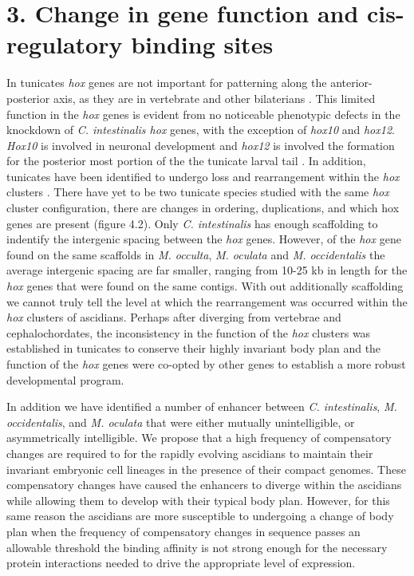 \section{3.	Change in gene function and cis-regulatory binding sites}
In tunicates \textit{hox} genes are not important for patterning along the anterior-posterior axis, as they are in vertebrate and other bilaterians \cite{finnerty_origins_2003,mallo_regulation_2013,ikuta_limited_2010}. This limited function in the \textit{hox} genes is evident from no noticeable phenotypic defects in the knockdown of \textit{C. intestinalis hox} genes, with the exception of \textit{hox10} and \textit{hox12}. \textit{Hox10} is involved in neuronal development and \textit{hox12} is involved the formation for the posterior most portion of the the tunicate larval tail \cite{ikuta_limited_2010}. In addition, tunicates have been identified to undergo loss and rearrangement within the \textit{hox} clusters \cite{ikuta_organization_2005}. There have yet to be two tunicate species studied with the same \textit{hox} cluster configuration, there are changes in ordering, duplications, and which hox genes are present (figure 4.2). Only \textit{C. intestinalis} has enough scaffolding to indentify the intergenic spacing between the \textit{hox} genes. However, of the \textit{hox} gene found on the same scaffolds in \textit{M. occulta}, \textit{M. oculata} and \textit{M. occidentalis} the average intergenic spacing are far smaller, ranging from 10-25 kb in length for the \textit{hox} genes that were found on the same contigs. With out additionally scaffolding we cannot truly tell the level at which the rearrangement was occurred within the \textit{hox} clusters of ascidians. Perhaps after diverging from vertebrae and cephalochordates, the inconsistency in the function of the \textit{hox} clusters was established in tunicates to conserve their highly invariant body plan and the function of the \textit{hox} genes were co-opted by other genes to establish a more robust developmental program. %

In addition we have identified a number of enhancer between \textit{C. intestinalis}, \textit{M. occidentalis}, and \textit{M. oculata} that were either mutually unintelligible, or asymmetrically intelligible. We propose that a high frequency of compensatory changes are required to for the rapidly evolving ascidians to maintain their invariant embryonic cell lineages in the presence of their compact genomes. These compensatory changes have caused the enhancers to diverge within the ascidians while allowing them to develop with their typical body plan. However, for this same reason the ascidians are more susceptible to undergoing a change of body plan when the frequency of compensatory changes in sequence passes an allowable threshold the binding affinity is not strong enough for the necessary protein interactions needed to drive the appropriate level of expression.

